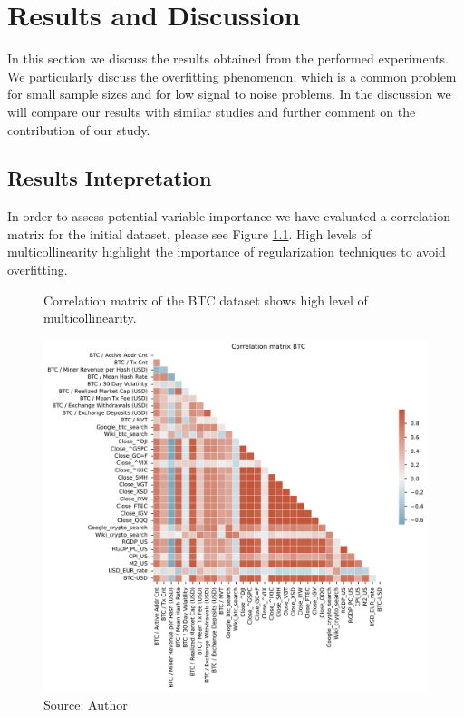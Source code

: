 \chapter{Results and Discussion}
\label{chap:five}
In this section we discuss the results obtained from 
the performed experiments. We particularly discuss the 
overfitting phenomenon, which is a common problem
for small sample sizes and for low signal to noise problems. 
In the discussion we will compare our
results with similar studies
and further comment on the 
contribution of our study.

\section{Results Intepretation}
\label{sec:results}
In order to assess potential variable importance
we have evaluated a correlation matrix for the initial
dataset, please see Figure \ref{fig:Corr_btc}. High 
levels of multicollinearity highlight the importance of
regularization techniques to avoid overfitting.

\begin{figure}[!h]
    \centering
    \caption{Correlation matrix of the BTC dataset shows high level of 
    multicollinearity.}
    \includegraphics[width=1\textwidth]{Figures/Corr_btc.png}
    \caption*{Source: Author}
    \label{fig:Corr_btc}
\end{figure}

